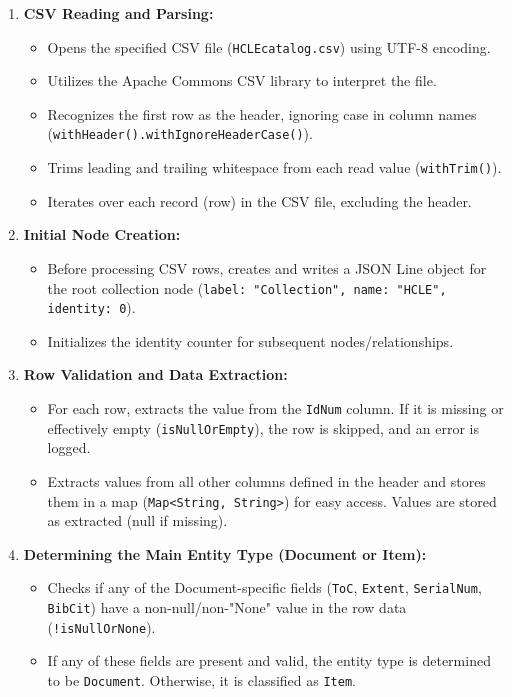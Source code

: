 \documentclass[11pt, a4paper]{article}
\begin{document}
\begin{enumerate}
    \item \textbf{CSV Reading and Parsing:}
        \begin{itemize}
            \item Opens the specified CSV file (\texttt{HCLEcatalog.csv}) using UTF-8 encoding.
            \item Utilizes the Apache Commons CSV library to interpret the file.
            \item Recognizes the first row as the header, ignoring case in column names \\
            (\texttt{withHeader().withIgnoreHeaderCase()}).
            \item Trims leading and trailing whitespace from each read value (\texttt{withTrim()}).
            \item Iterates over each record (row) in the CSV file, excluding the header.
        \end{itemize}

    \item \textbf{Initial Node Creation:}
        \begin{itemize}
            \item Before processing CSV rows, creates and writes a JSON Line object for the root collection node (\texttt{label: "Collection", name: "HCLE", identity: 0}).
            \item Initializes the identity counter for subsequent nodes/relationships.
        \end{itemize}

    \item \textbf{Row Validation and Data Extraction:}
        \begin{itemize}
            \item For each row, extracts the value from the \texttt{IdNum} column. If it is missing or effectively empty (\texttt{isNullOrEmpty}), the row is skipped, and an error is logged.
            \item Extracts values from all other columns defined in the header and stores them in a map (\texttt{Map<String, String>}) for easy access. Values are stored as extracted (null if missing).
        \end{itemize}

    \item \textbf{Determining the Main Entity Type (Document or Item):}
        \begin{itemize}
           \item Checks if any of the Document-specific fields (\texttt{ToC}, \texttt{Extent}, \texttt{SerialNum}, \texttt{BibCit}) have a non-null/non-"None" value in the row data (\texttt{!isNullOrNone}).
            \item If any of these fields are present and valid, the entity type is determined to be \texttt{Document}. Otherwise, it is classified as \texttt{Item}.
        \end{itemize}


\end{enumerate}
\end{document}
